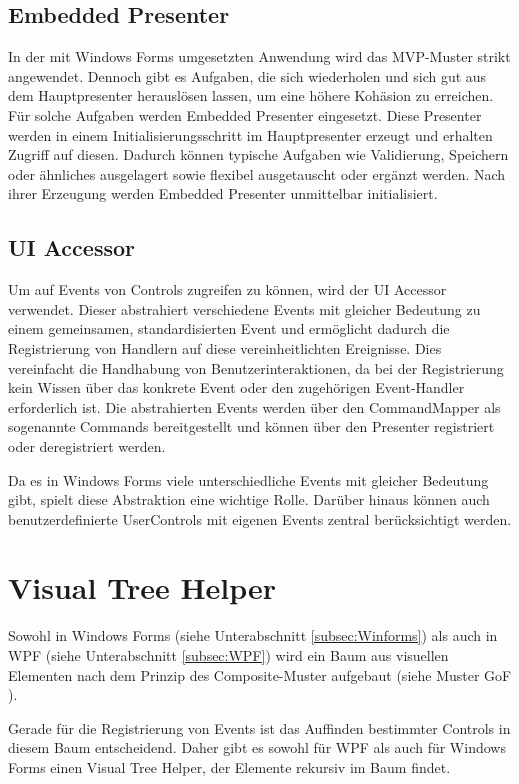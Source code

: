 \subsection{Embedded Presenter}
\label{subsec:embedded_presenter}
In der mit Windows Forms umgesetzten Anwendung wird das MVP-Muster strikt angewendet. Dennoch gibt es Aufgaben, die sich wiederholen und sich gut aus dem Hauptpresenter herauslösen lassen, um eine höhere Kohäsion zu erreichen. Für solche Aufgaben werden Embedded Presenter eingesetzt. Diese Presenter werden in einem Initialisierungsschritt im Hauptpresenter erzeugt und erhalten Zugriff auf diesen. Dadurch können typische Aufgaben wie Validierung, Speichern oder ähnliches ausgelagert sowie flexibel ausgetauscht oder ergänzt werden. Nach ihrer Erzeugung werden Embedded Presenter unmittelbar initialisiert.

\subsection{UI Accessor}

Um auf Events von Controls zugreifen zu können, wird der UI Accessor verwendet. Dieser abstrahiert verschiedene Events mit gleicher Bedeutung zu einem gemeinsamen, standardisierten Event und ermöglicht dadurch die Registrierung von Handlern auf diese vereinheitlichten Ereignisse. Dies vereinfacht die Handhabung von Benutzerinteraktionen, da bei der Registrierung kein Wissen über das konkrete Event oder den zugehörigen Event-Handler erforderlich ist. Die abstrahierten Events werden über den CommandMapper als sogenannte Commands bereitgestellt und können über den Presenter registriert oder deregistriert werden.

Da es in Windows Forms viele unterschiedliche Events mit gleicher Bedeutung gibt, spielt diese Abstraktion eine wichtige Rolle. Darüber hinaus können auch benutzerdefinierte UserControls mit eigenen Events zentral berücksichtigt werden.

\section{Visual Tree Helper}
\label{sec:visual_tree_helper}
Sowohl in Windows Forms (siehe Unterabschnitt \ref{subsec:Winforms}) als auch in WPF (siehe Unterabschnitt \ref{subsec:WPF}) wird ein Baum aus visuellen Elementen nach dem Prinzip des Composite-Muster aufgebaut (siehe Muster GoF \cite{gamma1995design}).

Gerade für die Registrierung von Events ist das Auffinden bestimmter Controls in diesem Baum entscheidend. Daher gibt es sowohl für WPF als auch für Windows Forms einen Visual Tree Helper, der Elemente rekursiv im Baum findet.

